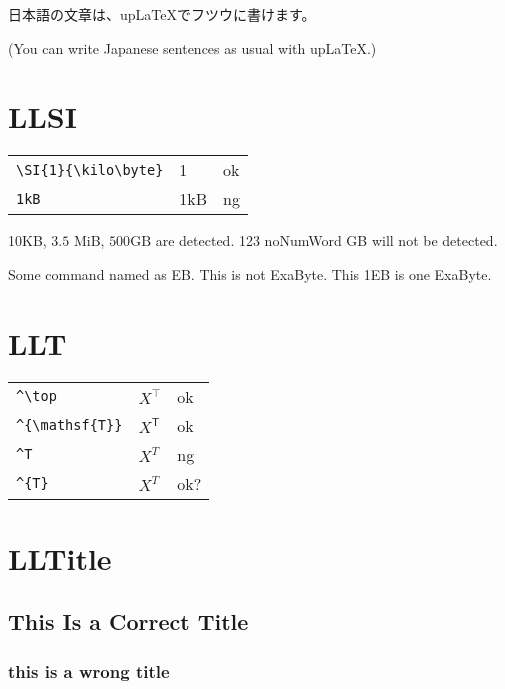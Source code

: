 \documentclass[a4paper]{article}
\newcommand{\tA}[1]{\textcolor{cA}{#1}}
\newcommand{\tC}[1]{\textcolor{cC}{#1}}
\newcommand{\tD}[1]{\textcolor{cD}{#1}}
\begin{document}
\vspace{\baselineskip}

日本語の文章は、upLaTeXでフツウに書けます。

(You can write Japanese sentences as usual with upLaTeX.)

\section{LLSI}

\begin{table}[H]
	\centering
	\begin{tabular}{lll}
		\verb|\SI{1}{\kilo\byte}| & \SI{1}{\kilo\byte} & \tA{ok} \\
		\verb|1kB|                & 1kB                & \tD{ng}
	\end{tabular}
\end{table}

\newcommand{\EB}{Some command named as EB}

10KB, $3.5$ MiB, $500\mathrm{GB}$ are detected. 123 noNumWord GB will not be detected.

\EB. This is not ExaByte. This 1EB is one ExaByte.

\section{LLT}

\begin{table}[H]
	\centering
	\begin{tabular}{lll}
		\verb|^\top|         & $X^\top$         & \tA{ok}  \\
		\verb|^{\mathsf{T}}| & $X^{\mathsf{T}}$ & \tA{ok}  \\
		\verb|^T|            & $X^T$            & \tD{ng}  \\
		\verb|^{T}|          & $X^{T}$          & \tC{ok?} \\
	\end{tabular}
\end{table}

\section{LLTitle}

\subsection{
	This Is a Correct Title
}

\subsubsection{this is a wrong title}
\end{document}
